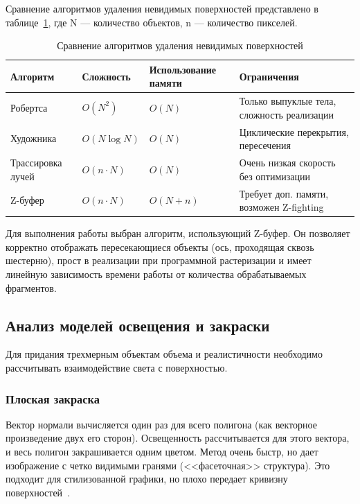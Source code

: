 Сравнение алгоритмов удаления невидимых поверхностей представлено в таблице~\ref{table:hsr}, где N --- количество объектов, n --- количество пикселей.
\begin{table}[h!]
	\caption{Сравнение алгоритмов удаления невидимых поверхностей}
	\label{table:hsr}
	\begin{tabular}{|p{3.3cm}|p{2.5cm}|p{3.2cm}|p{5cm}|}
		\hline
		Алгоритм          & Сложность      & Использование памяти & Ограничения                                \\ \hline
		Робертса          & $O(N^2)$       & $O(N)$               & Только выпуклые тела, сложность реализации \\ \hline
		Художника         & $O(N \log N)$  & $O(N)$               & Циклические перекрытия, пересечения        \\ \hline
		Трассировка лучей & $O(n \cdot N)$ & $O(N)$               & Очень низкая скорость без оптимизации      \\ \hline
		Z-буфер           & $O(n \cdot N)$ & $O(N + n)$           & Требует доп. памяти, возможен Z-fighting   \\ \hline
	\end{tabular}
\end{table}

Для выполнения работы выбран алгоритм, использующий Z-буфер. Он позволяет корректно отображать пересекающиеся объекты (ось, проходящая сквозь шестерню), прост в реализации при программной растеризации и имеет линейную зависимость времени работы от количества обрабатываемых фрагментов.

\subsection{Анализ моделей освещения и закраски}

Для придания трехмерным объектам объема и реалистичности необходимо рассчитывать взаимодействие света с поверхностью.

\subsubsection{Плоская закраска}
Вектор нормали вычисляется один раз для всего полигона (как векторное произведение двух его сторон). Освещенность рассчитывается для этого вектора, и весь полигон закрашивается одним цветом.
Метод очень быстр, но дает изображение с четко видимыми гранями (<<фасеточная>> структура). Это подходит для стилизованной графики, но плохо передает кривизну поверхностей~\cite{shikin2005}.


